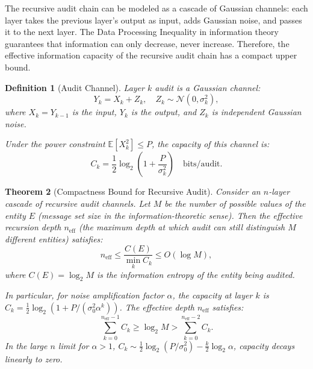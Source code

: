\documentclass[12pt,a4paper]{article}
\newtheorem{theorem}{Theorem}[section]
\newtheorem{definition}[theorem]{Definition}
\theoremstyle{definition}
\newcommand{\E}{\mathbb{E}}
\begin{document}
\noindent
The recursive audit chain can be modeled as a cascade of Gaussian channels: each layer takes the previous layer's output as input, adds Gaussian noise, and passes it to the next layer. The Data Processing Inequality in information theory guarantees that information can only decrease, never increase. Therefore, the effective information capacity of the recursive audit chain has a compact upper bound.

\begin{definition}[Audit Channel]\label{def:audit_channel}
Layer $k$ audit is a Gaussian channel:
\begin{equation}\label{eq:gaussian_channel}
    Y_k = X_k + Z_k, \quad Z_k \sim \mathcal{N}(0, \sigma_k^2),
\end{equation}
where $X_k = Y_{k-1}$ is the input, $Y_k$ is the output, and $Z_k$ is independent Gaussian noise.

Under the power constraint $\E[X_k^2] \leq P$, the capacity of this channel is:
\begin{equation}\label{eq:channel_capacity}
    C_k = \frac{1}{2} \log_2\left(1 + \frac{P}{\sigma_k^2}\right) \quad \text{bits/audit}.
\end{equation}
\end{definition}

\begin{theorem}[Compactness Bound for Recursive Audit]\label{thm:compactness}
Consider an $n$-layer cascade of recursive audit channels. Let $M$ be the number of possible values of the entity $E$ (message set size in the information-theoretic sense). Then the effective recursion depth $n_{\text{eff}}$ (the maximum depth at which audit can still distinguish $M$ different entities) satisfies:
\begin{equation}\label{eq:compactness_bound}
    n_{\text{eff}} \leq \frac{C(E)}{\min_k C_k} \leq O(\log M),
\end{equation}
where $C(E) = \log_2 M$ is the information entropy of the entity being audited.

In particular, for noise amplification factor $\alpha$, the capacity at layer $k$ is $C_k = \frac{1}{2}\log_2(1 + P/(\sigma_0^2 \alpha^k))$. The effective depth $n_{\text{eff}}$ satisfies:
\begin{equation}\label{eq:effective_depth}
    \sum_{k=0}^{n_{\text{eff}}-1} C_k \geq \log_2 M > \sum_{k=0}^{n_{\text{eff}}-2} C_k.
\end{equation}
In the large $n$ limit for $\alpha > 1$, $C_k \sim \frac{1}{2} \log_2(P/\sigma_0^2) - \frac{k}{2}\log_2 \alpha$, capacity decays linearly to zero.
\end{theorem}
\end{document}
